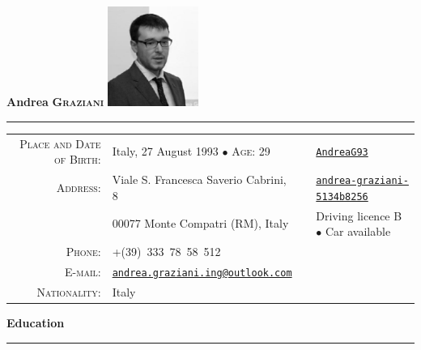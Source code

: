 \documentclass[english,10pt,a4paper]{article}
\newcommand{\CvBullet}{\hspace{0.05cm} \textcolor{CvColor}{$\bullet$} \hspace{0.05cm}}
\newcommand{\CvSection}[2]{\vspace{0.5cm}
	{\LARGE \textcolor{CvColor}{#1 \hspace{2pt} \textbf{#2}}} \\
	\textcolor{CvColor}{\rule[.5\baselineskip]{0.5\textwidth}{0.5pt}}}
\begin{document}
	
	{\Huge \textcolor{CvColor!50}{\textbf{Andrea}} \textcolor{CvColor!80}{\scshape \textbf{Graziani}}} \hfill
	\includegraphics[width=8em]{./Images/Photo.png} \\
	\textcolor{CvColor}{\rule[.5\baselineskip]{\textwidth}{1pt}}
	
	
	\begin{tabular}{rlrl}
		\textsc{Place and Date of Birth:} & Italy, 27 August 1993 \CvBullet \hspace{0.05cm} \textsc{Age}: 29 & \textsc{\faGithub} & \href{https://github.com/AndreaG93}{\texttt{AndreaG93}} \\
		
		\textsc{Address:} & Viale S. Francesca Saverio Cabrini, 8 & \textsc{\faLinkedin} & \href{https://it.linkedin.com/in/andrea-graziani-5134b8256}{\texttt{andrea-graziani-5134b8256}} \\
		
		& 00077 Monte Compatri (RM), Italy & \faCar & Driving licence B \CvBullet Car available \\
		
		\textsc{Phone:} & +(39)~333~78~58~512 && \\
		\textsc{E-mail:} & \href{mailto:andrea.graziani.ing@outlook.com}{\texttt{andrea.graziani.ing@outlook.com}} && \\
		\textsc{Nationality}: & Italy
	\end{tabular}
	
	\CvSection{\faGraduationCap}{Education}
	
\end{document}
